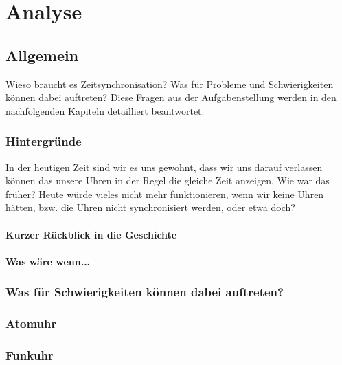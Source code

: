 
\chapter{Analyse}

\section{Allgemein}
Wieso braucht es Zeitsynchronisation? Was für Probleme und Schwierigkeiten können dabei auftreten? Diese Fragen aus der Aufgabenstellung werden in den nachfolgenden Kapiteln detailliert beantwortet.

\subsection{Hintergründe}
In der heutigen Zeit sind wir es uns gewohnt, dass wir uns darauf verlassen können das unsere Uhren in der Regel die gleiche Zeit anzeigen. 
Wie war das früher? Heute würde vieles nicht mehr funktionieren, wenn wir keine Uhren hätten, bzw. die Uhren nicht synchronisiert werden, oder etwa doch?

\subsubsection{Kurzer Rückblick in die Geschichte}

\subsubsection{Was wäre wenn...}

\subsection{Was für Schwierigkeiten können dabei auftreten?}

\subsection{Atomuhr}

\subsection{Funkuhr}

